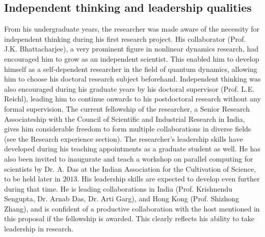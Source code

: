 \documentclass[a4paper,11pt,color]{article}
\begin{document}
\subsection{Independent thinking and leadership qualities}
\label{sec:indep_thinking}
From his undergraduate years, the researcher was made aware of the necessity for independent thinking during his first research project. His collaborator (Prof. J.K. Bhattacharjee), a very prominent figure in nonlinear dynamics research, had encouraged him to grow as an independent scientist. This enabled him to develop himself as a self-dependent researcher in the field of quantum dynamics, allowing him to choose his doctoral research subject beforehand. Independent thinking was also encouraged during his graduate years by his doctoral supervisor (Prof. L.E. Reichl), leading him to continue onwards to his postdoctoral research without any formal supervision. The current fellowship of the researcher, a Senior Research Associateship with the Council of Scientific and Industrial Research in India, gives him considerable freedom to form multiple collaborations in diverse fields (see the Research experience section). The researcher's leadership skills have developed during his teaching appointments as a graduate 
student as well. He has also been invited to inaugurate and teach a workshop on parallel computing for scientists by Dr. A. Das at the Indian Association for the Cultivation of Science, to be held later in $2013$. His leadership skills are expected to develop even further during that time. He is leading collaborations in India (Prof. Krishnendu Sengupta, Dr. Arnab Das, Dr. Arti Garg), and Hong Kong (Prof. Shizhong Zhang), and is confident of a productive collaboration with the host mentioned in this proposal if the fellowship is awarded. This clearly reflects his ability to take leadership in research.
\end{document}
